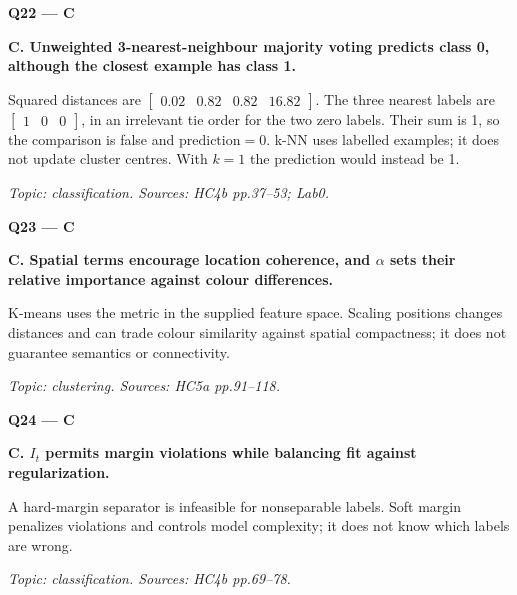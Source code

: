 \documentclass[11pt,a4paper]{article}
\begin{document}
\par\vspace{12pt}
\begin{minipage}{\linewidth}
\textbf{Q22 — C}\par\smallskip
\textbf{C. Unweighted 3-nearest-neighbour majority voting predicts class 0,\allowbreak{} although the closest example has class 1.}\par
Squared distances are \(\begin{bmatrix}0.02&0.82&0.82&16.82\end{bmatrix}\). The three nearest labels are \(\begin{bmatrix}1&0&0\end{bmatrix}\),\allowbreak{} in an irrelevant tie order for the two zero labels. Their sum is 1,\allowbreak{} so the comparison is false and \(\text{prediction}=0\). k-NN uses labelled examples; it does not update cluster centres. With \(k=1\) the prediction would instead be 1.\par
{\small\itshape Topic: classification. Sources: HC4b pp.37–53; Lab0.}

\end{minipage}
\par\vspace{12pt}
\begin{minipage}{\linewidth}
\textbf{Q23 — C}\par\smallskip
\textbf{C. Spatial terms encourage location coherence,\allowbreak{} and \(\alpha\) sets their relative importance against colour differences.}\par
K-means uses the metric in the supplied feature space. Scaling positions changes distances and can trade colour similarity against spatial compactness; it does not guarantee semantics or connectivity.\par
{\small\itshape Topic: clustering. Sources: HC5a pp.91–118.}

\end{minipage}
\par\vspace{12pt}
\begin{minipage}{\linewidth}
\textbf{Q24 — C}\par\smallskip
\textbf{C. \(I_t\) permits margin violations while balancing fit against regularization.}\par
A hard-margin separator is infeasible for nonseparable labels. Soft margin penalizes violations and controls model complexity; it does not know which labels are wrong.\par
{\small\itshape Topic: classification. Sources: HC4b pp.69–78.}

\end{minipage}
\end{document}
